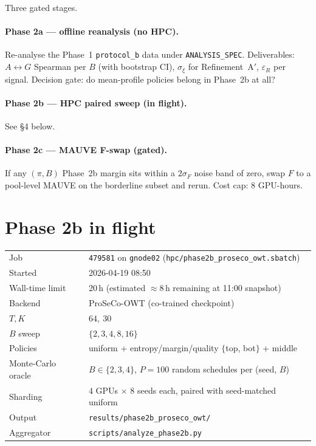 \documentclass[11pt,a4paper]{article}
\newcommand{\eps}{\varepsilon}
\begin{document}
Three gated stages.

\paragraph{Phase 2a --- offline reanalysis (no HPC).} Re-analyse the Phase~1
\texttt{protocol\_b} data under \texttt{ANALYSIS\_SPEC}. Deliverables:
$A{\leftrightarrow}G$ Spearman per $B$ (with bootstrap CI), $\sigma_\xi$ for
Refinement~A$'$, $\eps_R$ per signal. Decision gate: do mean-profile policies
belong in Phase~2b at all?

\paragraph{Phase 2b --- HPC paired sweep (in flight).} See \S4 below.

\paragraph{Phase 2c --- MAUVE F-swap (gated).} If any $(\pi, B)$ Phase~2b
margin sits within a $2\sigma_F$ noise band of zero, swap $F$ to a
pool-level MAUVE on the borderline subset and rerun. Cost cap: $8$ GPU-hours.

\section{Phase 2b in flight}

\begin{center}
\begin{tabular}{ll}
\toprule
Job & \texttt{479581} on \texttt{gnode02} (\texttt{hpc/phase2b\_proseco\_owt.sbatch}) \\
Started & 2026-04-19 08:50 \\
Wall-time limit & 20\,h (estimated $\approx$8\,h remaining at 11:00 snapshot) \\
Backend & ProSeCo-OWT (co-trained checkpoint) \\
$T,K$ & $64,\ 30$ \\
$B$ sweep & $\{2, 3, 4, 8, 16\}$ \\
Policies & uniform + entropy/margin/quality $\{$top, bot$\}$ + middle \\
Monte-Carlo oracle & $B \in \{2,3,4\}$, $P{=}100$ random schedules per (seed, $B$) \\
Sharding & $4$ GPUs $\times$ $8$ seeds each, paired with seed-matched uniform \\
Output & \texttt{results/phase2b\_proseco\_owt/} \\
Aggregator & \texttt{scripts/analyze\_phase2b.py} \\
\bottomrule
\end{tabular}
\end{center}
\end{document}

